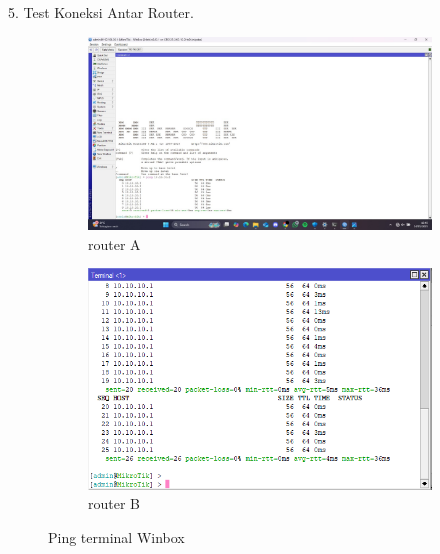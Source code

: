 5. Test Koneksi Antar Router.
\begin{figure}[H]
    \centering
    \begin{subfigure}[b]{0.3\linewidth}
      \centering
      \includegraphics[width=\linewidth]{image/bridge8.jpg}
      \caption{router A}
    \end{subfigure}
    \hspace{1cm}
    \begin{subfigure}[b]{0.3\linewidth}
      \centering
      \includegraphics[width=\linewidth]{image/bridge5.png}
      \caption{router B}
    \end{subfigure}
    \caption{Ping terminal Winbox}
\end{figure}

